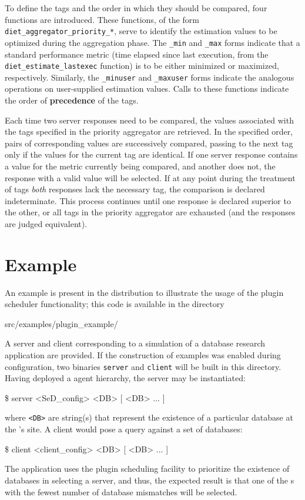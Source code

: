 To define the tags and the order in which they should be compared, four
functions are introduced.  These functions, of the form
\texttt{diet\_aggregator\_priority\_*}, serve to identify the estimation values
to be optimized during the aggregation phase.  The \texttt{\_min} and
\texttt{\_max} forms indicate that a standard performance metric (\eg time
elapsed since last execution, from the \texttt{diet\_estimate\_lastexec}
function) is to be either minimized or maximized, respectively.  Similarly, the
\texttt{\_minuser} and \texttt{\_maxuser} forms indicate the analogous
operations on user-supplied estimation values.  Calls to these functions
indicate the order of \textbf{precedence} of the tags.

Each time two server responses need to be compared, the values associated with
the tags specified in the priority aggregator are retrieved. In the specified
order, pairs of corresponding values are successively compared, passing to the
next tag only if the values for the current tag are identical. If one server
response contains a value for the metric currently being compared, and another
does not, the response with a valid value will be selected. If at any point
during the treatment of tags \emph{both} responses lack the necessary tag, the
comparison is declared indeterminate.  This process continues until one
response is declared superior to the other, or all tags in the priority
aggregator are exhausted (and the responses are judged equivalent).


\section{Example}

An example is present in the \diet distribution to illustrate the usage
of the plugin scheduler functionality; this code is available in the directory
\begin{code}
src/examples/plugin\_example/
\end{code}
A \diet server and client corresponding to a simulation of a database research
application are provided. If the construction of examples was enabled during
\diet configuration, two binaries \texttt{server} and \texttt{client} will be
built in this directory. Having deployed a \diet agent hierarchy, the server
may be instantiated:
\begin{code}
  \$ server <SeD\_config> <DB> [ <DB> ... ]
\end{code}
where \texttt{<DB>} are string(s) that represent the existence of a particular
database at the {\sed}'s site.  A client would pose a query against a set of
databases:
\begin{code}
  \$ client <client\_config> <DB> [ <DB> ... ]
\end{code}
The application uses the plugin scheduling facility to prioritize the existence
of databases in selecting a server, and thus, the expected result is that one
of the {\sed}s with the fewest number of database mismatches will be selected.

